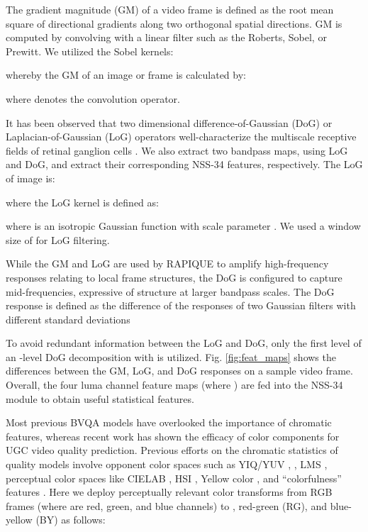 \documentclass[transmag]{IEEEtran}
\begin{document}
The gradient magnitude (GM) of a video frame is defined as the root mean square of directional gradients along two orthogonal spatial directions. GM is computed by convolving with a linear filter such as the Roberts, Sobel, or Prewitt. We utilized the Sobel kernels:

whereby the GM of an image or frame  is calculated by:

where  denotes the convolution operator.

It has been observed that two dimensional difference-of-Gaussian (DoG) or Laplacian-of-Gaussian (LoG) operators well-characterize the multiscale receptive fields of retinal ganglion cells \cite{campbell1968application}. We also extract two bandpass maps, using LoG and DoG, and extract their corresponding NSS-34 features, respectively. The LoG of image  is:

where the LoG kernel is defined as:

where  is an isotropic Gaussian function with scale parameter . We used a window size of  for LoG filtering. 

While the GM and LoG are used by RAPIQUE to amplify high-frequency responses relating to local frame structures, the DoG is configured to capture mid-frequencies, expressive of structure at larger bandpass scales. The DoG response is defined as the difference of the responses of two Gaussian filters with different standard deviations


To avoid redundant information between the LoG and DoG, only the first level of an -level DoG decomposition with  is utilized. Fig. \ref{fig:feat_maps} shows the differences between the GM, LoG, and DoG responses on a sample video frame. Overall, the four luma channel feature maps  (where ) are fed into the NSS-34 module to obtain useful statistical features.

Most previous BVQA models have overlooked the importance of chromatic features, whereas recent work \cite{tu2020ugc, ghadiyaram2017capture, kundu2017no, chen2020chroma} has shown the efficacy of color components for UGC video quality prediction. Previous efforts on the chromatic statistics of quality models involve opponent color spaces such as YIQ/YUV \cite{zhang2011fsim, pei2015image},  \cite{zhang2015feature}, LMS \cite{zhang2015feature, ghadiyaram2017perceptual}, perceptual color spaces like CIELAB \cite{rajashekar2010perceptual, kundu2017no, ghadiyaram2017perceptual}, HSI \cite{lee2016toward, ghadiyaram2017perceptual}, Yellow color \cite{ghadiyaram2017perceptual}, and ``colorfulness'' features \cite{hasler2003measuring, korhonen2019two, tu2020ugc}. Here we deploy perceptually relevant color transforms from RGB frames (where  are red, green, and blue channels) to , red-green (RG), and blue-yellow (BY) as follows:
\end{document}
